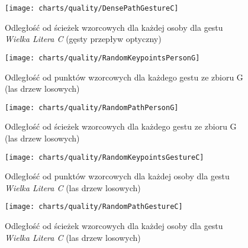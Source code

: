       \begin{figure}[!ht]
        \centering
        \texttt{[image: charts/quality/DensePathGestureC]}
        \caption[Odległość od ścieżek wzorcowych dla każdej osoby dla gestu C (gęsty przepływ optyczny)]
                {Odległość od ścieżek wzorcowych dla każdej osoby dla gestu\\\textit{Wielka Litera C} (gęsty przepływ optyczny)}
        \label{fig:DensePathGestureC}
      \end{figure}

    \newpage
      \begin{figure}[!ht]
        \centering
        \texttt{[image: charts/quality/RandomKeypointsPersonG]}
        \caption[Odległość od punktów wzorcowych dla każdego gestu (las drzew losowych)]
                {Odległość od punktów wzorcowych dla każdego gestu ze zbioru G\\(las drzew losowych)}
        \label{fig:RandomKeypointsPersonG}
      \end{figure}

      \begin{figure}[!ht]
        \centering
        \texttt{[image: charts/quality/RandomPathPersonG]}
        \caption[Odległość od ścieżek wzorcowych dla każdego gestu (las drzew losowych)]
                {Odległość od ścieżek wzorcowych dla każdego gestu ze zbioru G\\(las drzew losowych)}
        \label{fig:RandomPathPersonG}
      \end{figure}

    \newpage
      \begin{figure}[!ht]
        \centering
        \texttt{[image: charts/quality/RandomKeypointsGestureC]}
        \caption[Odległość od punktów wzorcowych dla każdej osoby dla gestu C (las drzew losowych)]
                {Odległość od punktów wzorcowych dla każdej osoby dla gestu\\
                 \textit{Wielka Litera C} (las drzew losowych)}
        \label{fig:RandomKeypointsGestureC}
      \end{figure}

      \begin{figure}[!ht]
        \centering
        \texttt{[image: charts/quality/RandomPathGestureC]}
        \caption[Odległość od ścieżek wzorcowych dla każdej osoby dla gestu C (las drzew losowych)]
                {Odległość od ścieżek wzorcowych dla każdej osoby dla gestu\\
                 \textit{Wielka Litera C} (las drzew losowych)}
        \label{fig:RandomPathGestureC}
      \end{figure}

